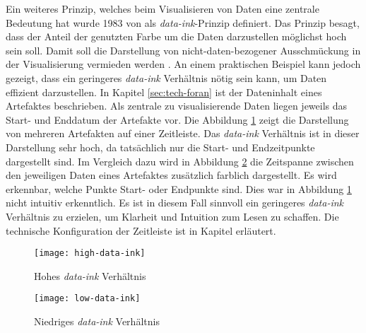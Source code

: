 \par Ein weiteres Prinzip, welches beim Visualisieren von Daten eine zentrale Bedeutung hat wurde 1983 von \citeauthor{tufteBookReviewsVisual1984} als \textit{data-ink}-Prinzip definiert. Das Prinzip besagt, dass der Anteil der genutzten Farbe um die Daten darzustellen möglichst hoch sein soll. Damit soll die Darstellung von nicht-daten-bezogener \glqq Ausschmückung \grqq in der Visualisierung vermieden werden \autocite{tufteBookReviewsVisual1984}. An einem praktischen Beispiel kann jedoch gezeigt, dass ein geringeres \textit{data-ink} Verhältnis nötig sein kann, um Daten effizient darzustellen. In Kapitel \ref{sec:tech-foran} ist der Dateninhalt eines Artefaktes beschrieben. Als zentrale zu visualisierende Daten liegen jeweils das Start- und Enddatum der Artefakte vor. Die Abbildung \ref{fig:high-data-ink} zeigt die Darstellung von mehreren Artefakten auf einer Zeitleiste. Das \textit{data-ink} Verhältnis ist in dieser Darstellung sehr hoch, da tatsächlich nur die Start- und Endzeitpunkte dargestellt sind. Im Vergleich dazu wird in Abbildung \ref{fig:low-data-ink} die Zeitspanne zwischen den jeweiligen Daten eines Artefaktes zusätzlich farblich dargestellt. Es wird erkennbar, welche Punkte Start- oder Endpunkte sind. Dies war in Abbildung \ref{fig:high-data-ink} nicht intuitiv erkenntlich. Es ist in diesem Fall sinnvoll ein geringeres \textit{data-ink} Verhältnis zu erzielen, um Klarheit und Intuition zum Lesen zu schaffen. Die technische Konfiguration der Zeitleiste ist in Kapitel  erläutert.
%
\begin{figure}
    \centering
    \texttt{[image: high-data-ink]}
    \caption{Hohes \textit{data-ink} Verhältnis}
    \label{fig:high-data-ink}
\end{figure}
%
\begin{figure}
    \centering
    \texttt{[image: low-data-ink]}
    \caption{Niedriges \textit{data-ink} Verhältnis}
    \label{fig:low-data-ink}
\end{figure}
%
